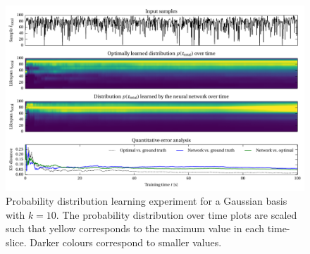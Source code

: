 \documentclass[a4paper,11pt]{article}
\begin{document}
\begin{figure}
    \centering
    \includegraphics{media/net_probability_gaussian_10_100000_0.pdf}
    \caption{Probability distribution learning experiment for a Gaussian basis with $k = 10$. The probability distribution over time plots are scaled such that yellow corresponds to the maximum value in each time-slice. Darker colours correspond to smaller values.}
    \label{fig:analysis_pdist_gauss}
\end{figure}
\end{document}

